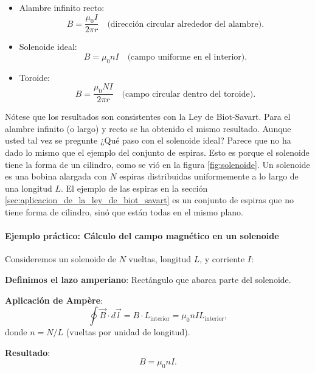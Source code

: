 \begin{itemize}
  \item Alambre infinito recto:  
    \[
    B = \frac{\mu_0 I}{2\pi r} \quad \text{(dirección circular alrededor del alambre)}.
    \]
  \item Solenoide ideal:  
     \[
     B = \mu_0 n I \quad \text{(campo uniforme en el interior)}.
     \]
  \item Toroide:  
     \[
     B = \frac{\mu_0 N I}{2\pi r} \quad \text{(campo circular dentro del toroide)}.
     \]
\end{itemize}
Nótese que los resultados son consistentes con la Ley de Biot-Savart. Para el alambre infinito (o largo) y recto se ha obtenido el mismo resultado. Aunque usted tal vez se pregunte ¿Qué paso con el solenoide ideal? Parece que no ha dado lo mismo que el ejemplo del conjunto de espiras. Esto es porque el solenoide tiene la forma de un cilindro, como se vió en la figura \ref{fig:solenoide}. Un solenoide es una bobina alargada con \(N\) espiras distribuidas uniformemente a lo largo de una longitud \(L\). El ejemplo de las espiras en la sección \ref{sec:aplicacion_de_la_ley_de_biot_savart} es un conjunto de espiras que no tiene forma de cilindro, sinó que están todas en el mismo plano.

\paragraph{Ejemplo práctico: Cálculo del campo magnético en un solenoide}

Consideremos un solenoide de \(N\) vueltas, longitud \(L\), y corriente \(I\):

\textbf{Definimos el lazo amperiano}: Rectángulo que abarca parte del solenoide.

\textbf{Aplicación de Ampère}: 
\[
  \oint \vec{B} \cdot d\vec{l} = B \cdot L_{\text{interior}} = \mu_0 n I L_{\text{interior}},
\]
donde \(n = N/L\) (vueltas por unidad de longitud).  

\textbf{Resultado}: 
\[
  B = \mu_0 n I.
\]